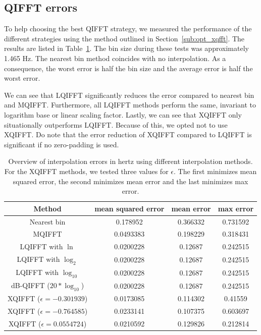 \documentclass[a4paper,10pt,twocolumn]{article}
\begin{document}
\subsection{QIFFT errors}  \label{sub:exp:qifft}
To help choosing the best QIFFT strategy, we measured the performance of the different strategies using the method outlined in Section~\ref{sub:opt_xqfft}. The results are listed in Table~\ref{tab:qifft_error}. The bin size during these tests was approximately 1.465 Hz. The nearest bin method coincides with no interpolation. As a consequence, the worst error is half the bin size and the average error is half the worst error.

We can see that LQIFFT significantly reduces the error compared to nearest bin and MQIFFT. Furthermore, all LQIFFT methods perform the same, invariant to logarithm base or linear scaling factor. Lastly, we can see that XQIFFT only situationally outperforms LQIFFT. Because of this, we opted not to use XQIFFT. Do note that the error reduction of XQIFFT compared to LQIFFT is significant if no zero-padding is used.
\begin{table}[h]
    \centering
    \begin{tabular}{c|ccc}
        Method & mean squared error & mean error & max error \\
        \hline
        Nearest bin & 0.178952 & 0.366332 & 0.731592 \\
        MQIFFT & 0.0493383 & 0.198229 & 0.318431 \\
        LQIFFT with $\ln$ & 0.0200228 & 0.12687 & 0.242515 \\
        LQIFFT with $\log_2$ & 0.0200228 & 0.12687 & 0.242515 \\
        LQIFFT with $\log_{10}$ & 0.0200228 & 0.12687 & 0.242515 \\
        dB-QIFFT ($20 * \log_{10}$) & 0.0200228 & 0.12687 & 0.242515 \\
        XQIFFT ($\epsilon = -0.301939$) & 0.0173085 & 0.114302 & 0.41559 \\
        XQIFFT ($\epsilon = -0.764585$) & 0.0233141 & 0.107375 & 0.603697 \\
        XQIFFT ($\epsilon = 0.0554724$) & 0.0210592 & 0.129826 & 0.212814
    \end{tabular}
    \caption{Overview of interpolation errors in hertz using different interpolation methods. For the XQIFFT methods, we tested three values for $\epsilon$. The first minimizes mean squared error, the second minimizes mean error and the last minimizes max error.}
    \label{tab:qifft_error}
\end{table}
\end{document}
